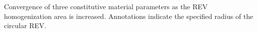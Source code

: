 \label{fig:revconverge} Convergence of three constitutive material parameters as the REV homogenization area is increased. Annotations indicate the specified radius of the circular REV.
